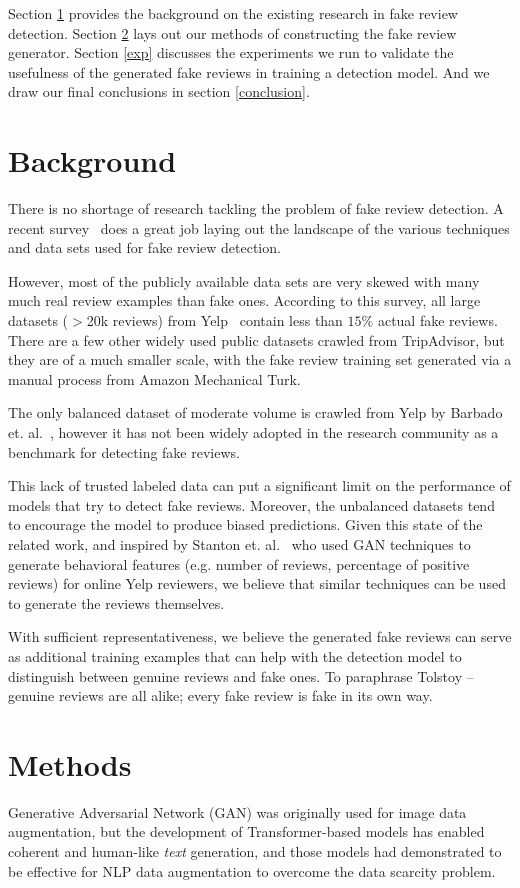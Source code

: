 \documentclass[conference, 11pt]{IEEEtran} %
\theoremstyle{plain}
\theoremstyle{definition}
\begin{document}
Section \ref{bg} provides the background on the existing research in fake review detection. Section \ref{methods} lays out our methods of constructing the fake review generator. Section \ref{exp} discusses the experiments we run to validate the usefulness of the generated fake reviews in training a detection model. And we draw our final conclusions in section \ref{conclusion}.


\section{Background}
\label{bg}
There is no shortage of research tackling the problem of fake review detection. A recent survey~\cite{Mohawesh2021} does a great job laying out the landscape of the various techniques and data sets used for fake review detection.

However, most of the publicly available data sets are very skewed with many much real review examples than fake ones. According to this survey, all large datasets ($>$20k reviews) from Yelp~\cite{rayana2015collective} contain less than $15\%$ actual fake reviews. There are a few other widely used public datasets crawled from TripAdvisor, but they are of a much smaller scale, with the fake review training set generated via a manual process from Amazon Mechanical Turk.

The only balanced dataset of moderate volume is crawled from Yelp by Barbado et. al.~\cite{barbado2019framework}, however it has not been widely adopted in the research community as a benchmark for detecting fake reviews.

This lack of trusted labeled data can put a significant limit on the performance of models that try to detect fake reviews. Moreover, the unbalanced datasets tend to encourage the model to produce biased predictions. Given this state of the related work, and inspired by Stanton et. al.~\cite{stanton2019gans} who used GAN techniques to generate behavioral features (e.g. number of reviews, percentage of positive reviews) for online Yelp reviewers, we believe that similar techniques can be used to generate the reviews themselves.

With sufficient representativeness, we believe the generated fake reviews can serve as additional training examples that can help with the detection model to distinguish between genuine reviews and fake ones. To paraphrase Tolstoy --  genuine reviews are all alike; every fake review is fake in its own way.


\section{Methods}
\label{methods}
Generative Adversarial Network (GAN) was originally used for image data augmentation, but the development of Transformer-based models has enabled coherent and human-like \textit{text} generation, and those models had demonstrated to be effective for NLP data augmentation to overcome the data scarcity problem.
\end{document}

